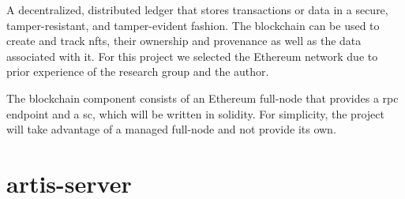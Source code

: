A decentralized, distributed ledger that stores transactions or data in a secure, tamper-resistant, and tamper-evident fashion. The blockchain can be used to create and track \glspl{nft}, their ownership and provenance as well as the data associated with it. For this project we selected the Ethereum network due to prior experience of the research group and the author. 

The blockchain component consists of an Ethereum full-node that provides a \gls{rpc} endpoint and a \gls{sc}, which will be written in solidity. For simplicity, the project will take advantage of a managed full-node and not provide its own.


\section{artis-server}
